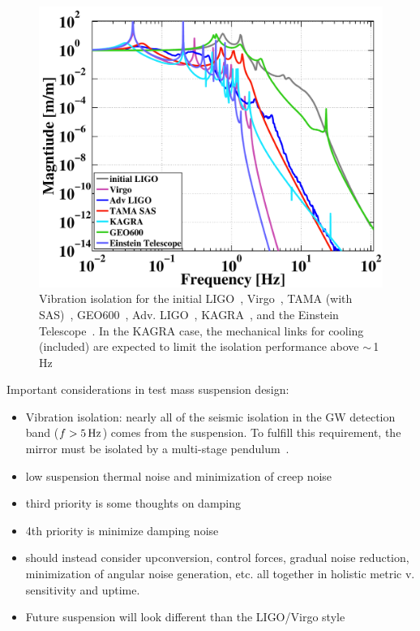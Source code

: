 \begin{figure}[h]
\centering
\includegraphics[width=\columnwidth]{Figures/SeismicIsolations.pdf}
\caption{Vibration isolation for the initial LIGO~\cite{ponslet:432, Giaime:1996},
        Virgo~\cite{Stefano:2001, Virgo:SA2010, Accadia:2011jh},
        TAMA (with SAS)~\cite{Szabi:TAMASAS},
        GEO600~\cite{Hartmut:PhD, Ken:GEOseismic, plissi:3055},
        Adv. LIGO~\cite{aLIGO:Seismic2002},
        KAGRA~\cite{Somiya:2011tb}, and the
        Einstein Telescope~\cite{ET2011}. In the KAGRA case,
      the mechanical links for cooling (included) are expected to limit the
      isolation performance above $\sim$\,1\,Hz~\cite{Takahashi:email}}
\label{fig:SeismicTFs}
\end{figure}


Important considerations in test mass suspension design\cite{SUS:2012, Aston:2012}:
\begin{itemize}
   \item Vibration isolation: nearly all of the seismic isolation in the GW detection band ($f > 5\,\rm Hz$)
     comes from the suspension. To fulfill this requirement, the mirror must be isolated by a
     multi-stage pendulum~\cite{Beker:2011}.
   \item low suspension thermal noise and minimization of creep noise~\cite{Levin:2012ek, Gretarsson:2005gs}
   \item third priority is some thoughts on damping
   \item 4th priority is minimize damping noise
   \item should instead consider upconversion, control forces, gradual noise
      reduction, minimization of angular noise generation, etc. all together in
      holistic metric v. sensitivity and uptime.
   \item Future suspension will look different than the LIGO/Virgo style
\end{itemize}

